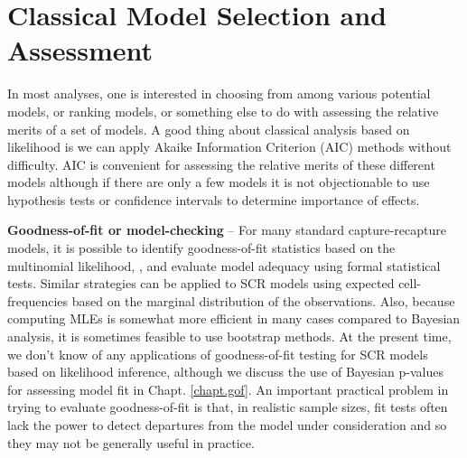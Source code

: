 \section{Classical Model Selection and Assessment}

In most analyses, one is interested in choosing from among various
potential models, or ranking models, or something else to do with
assessing the relative merits of a set of models. A good thing about
classical analysis based on likelihood is we can apply Akaike
Information Criterion (AIC) methods
\citep{burnham_anderson:2002} without difficulty. 
AIC is convenient for assessing the relative
merits of these different models although if there are only a few
models it is not objectionable to use hypothesis tests or confidence
intervals to determine importance of effects. 


{\bf Goodness-of-fit or model-checking} -- For many standard capture-recapture models,
it is possible to identify goodness-of-fit statistics 
based on the
multinomial likelihood,
\citep[][Chapt. 5]{cooch_white:2006},
 and evaluate model adequacy using formal
statistical tests. Similar strategies can be applied to SCR models
using expected cell-frequencies based on the marginal distribution of
the observations. Also, because computing MLEs is somewhat more
efficient in many cases compared to Bayesian analysis, it is 
sometimes feasible to use bootstrap methods. At the present time,
we don't know of any applications of goodness-of-fit testing for SCR
models based on likelihood inference, although we discuss the use of
Bayesian p-values for assessing model fit in Chapt. \ref{chapt.gof}. An
important practical problem in trying to evaluate  goodness-of-fit is
that, in realistic sample sizes, fit tests often lack the power to
detect departures from the model under consideration and so they may
not be generally useful in practice. 


